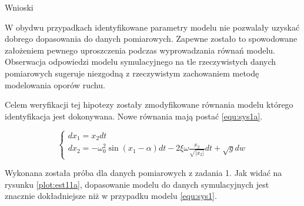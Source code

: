 \documentclass[12pt]{article}
\begin{document}
  \begin{section}{Wnioski}
  
    W obydwu przypadkach identyfikowane parametry modelu nie pozwalały uzyskać
    dobrego dopasowania do danych pomiarowych. Zapewne zostało to spowodowane
    założeniem pewnego uproszczenia podczas wyprowadzania równań modelu.
    Obserwacja odpowiedzi modelu symulacyjnego na tle rzeczywistych danych
    pomiarowych sugeruje niezgodną z rzeczywistym zachowaniem metodę modelowania
    oporów ruchu.
    
    Celem weryfikacji tej hipotezy zostały zmodyfikowane równania modelu którego
    identyfikacja jest dokonywana. Nowe równania mają postać \ref{equ:sys1a}.
    
    \begin{equation}
      \begin{cases}
        dx_1=x_2dt \\
        dx_2=-\omega_0^2\sin(x_1-\alpha)dt-2\xi\omega\frac{x_2}{\sqrt{|x_2|}}dt+\sqrt{g}dw
      \end{cases}
      \label{equ:sys1a}
    \end{equation}
    \vspace{0.5cm}
    
    Wykonana została próba dla danych pomiarowych z zadania 1. Jak widać na
    rysunku \ref{plot:est11a}, dopasowanie modelu do danych symulacyjnych jest
    znacznie dokładniejsze niż w przypadku modelu \ref{equ:sys1}.


\end{section}
\end{document}
